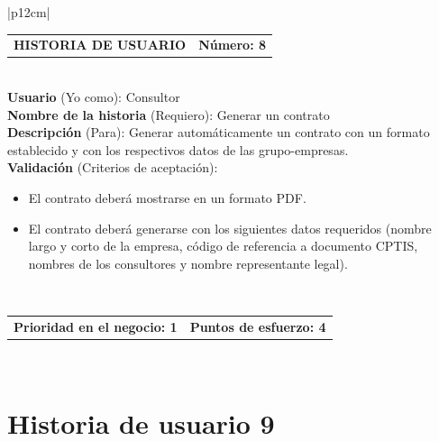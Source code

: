 \documentclass[11pt,letterpaper]{report}
\begin{document}
	\begin{center}	
		\begin{tabular}{|p{12cm}|}
			\hline
			\begin{tabular}{c|c}
				\textbf{HISTORIA DE USUARIO} & \textbf{Número: 8} \\
			\end{tabular} \\ \hline
			\textbf{Usuario} (Yo como): Consultor \\ \hline
			\textbf{Nombre de la historia} (Requiero): Generar un contrato \\ \hline
			\textbf{Descripción} (Para): Generar automáticamente un contrato con un formato establecido y con los respectivos datos de las grupo-empresas.\\ \hline
			\textbf{Validación} (Criterios de aceptación): \\
			\begin{minipage}{12cm}
				\begin{itemize}
					\item El contrato deberá mostrarse en un formato PDF.
					\item El contrato deberá generarse con los siguientes datos requeridos (nombre largo y corto de la empresa, código de referencia a documento CPTIS, nombres de los consultores y nombre representante legal).
				\end{itemize}
			\end{minipage} \\ \hline
			\begin{tabular}{c|c}
				\textbf{Prioridad en el negocio: 1} & \textbf{Puntos de esfuerzo: 4} \\
			\end{tabular} \\ \hline
		\end{tabular}
	\end{center}
	
	\section{Historia de usuario 9}
	
\end{document}
